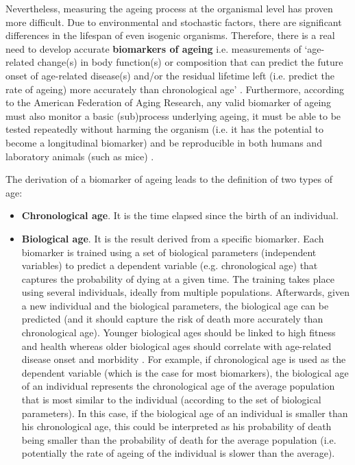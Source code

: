 \bigskip

Nevertheless, measuring the ageing process at the organismal level has proven more difficult. Due to environmental and stochastic factors, there are significant differences in the lifespan of even isogenic organisms. Therefore, there is a real need to develop accurate \textbf{biomarkers of ageing} i.e. measurements of `age-related change(s) in body function(s) or composition that can predict the future onset of age-related disease(s) and/or the residual lifetime left (i.e. predict the rate of ageing) more accurately than chronological age' \cite{Burkle2015a}. Furthermore, according to the American Federation of Aging Research, any valid biomarker of ageing must also monitor a basic (sub)process underlying ageing, it must be able to be tested repeatedly without harming the organism (i.e. it has the potential to become a longitudinal biomarker) and be reproducible in both humans and laboratory animals (such as mice) \cite{Burkle2015a}.

\bigskip

The derivation of a biomarker of ageing leads to the definition of two types of age:

\begin{itemize}
	
	\item \textbf{Chronological age}. It is the time elapsed since the birth of an individual.
	
	\item \textbf{Biological age}. It is the result derived from a specific biomarker. Each biomarker is trained using a set of biological parameters (independent variables) to predict a dependent variable (e.g. chronological age) that captures the probability of dying at a given time. The training takes place using several individuals, ideally from multiple populations. Afterwards, given a new individual and the biological parameters, the biological age can be predicted (and it should capture the risk of death more accurately than chronological age). Younger biological ages should be linked to high fitness and health whereas older biological ages should correlate with age-related disease onset and morbidity \cite{Benayoun2015a}. For example, if chronological age is used as the dependent variable (which is the case for most biomarkers), the biological age of an individual represents the chronological age of the average population that is most similar to the individual (according to the set of biological parameters). In this case, if the biological age of an individual is smaller than his chronological age, this could be interpreted as his probability of death being smaller than the probability of death for the average population (i.e. potentially the rate of ageing of the individual is slower than the average). 
	
\end{itemize}

